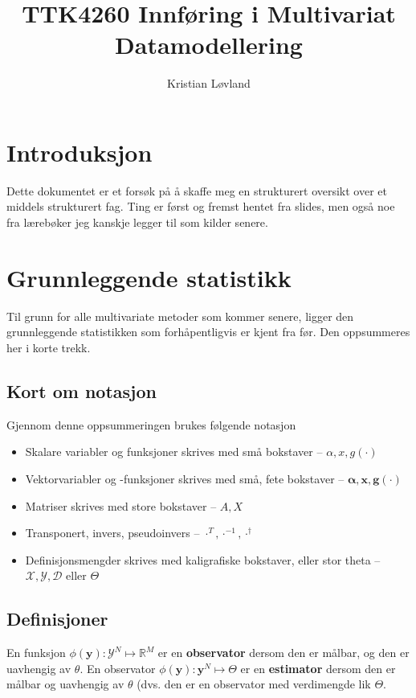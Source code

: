 \documentclass[12pt]{article}
\title{TTK4260 Innføring i Multivariat Datamodellering}
\date{}
\author{Kristian Løvland}
\begin{document}
\maketitle
\tableofcontents

\newpage
\section{Introduksjon}
Dette dokumentet er et forsøk på å skaffe meg en strukturert oversikt over et middels strukturert fag. Ting er først og fremst hentet fra slides, men også noe fra lærebøker jeg kanskje legger til som kilder senere.

\newpage
\section{Grunnleggende statistikk}
Til grunn for alle multivariate metoder som kommer senere, ligger den grunnleggende statistikken som forhåpentligvis er kjent fra før. Den oppsummeres her i korte trekk.

\subsection{Kort om notasjon}
Gjennom denne oppsummeringen brukes følgende notasjon
\begin{itemize}
\item Skalare variabler og funksjoner skrives med små bokstaver -- $\alpha, x, g(\cdot)$
\item Vektorvariabler og -funksjoner skrives med små, fete bokstaver -- $\mathbf{\alpha}, \mathbf{x}, \mathbf{g(\cdot)}$
\item Matriser skrives med store bokstaver -- $A, X$
\item Transponert, invers, pseudoinvers -- $\cdot^T, \cdot^{-1}, \cdot^\dagger$
\item Definisjonsmengder skrives med kaligrafiske bokstaver, eller stor theta -- $\mathcal{X}, \mathcal{Y}, \mathcal{D}$ eller $\Theta$
\end{itemize}

\subsection{Definisjoner}
En funksjon \(\phi(\boldsymbol{y}): \mathcal{Y}^{N} \mapsto \mathbb{R}^{M}\) er en \textbf{observator} dersom den er målbar, og den er uavhengig av $\theta$. En observator \(\phi(\boldsymbol{y}): \boldsymbol{y}^{N} \mapsto \Theta\) er en \textbf{estimator} dersom den er målbar og uavhengig av $\theta$ (dvs. den er en observator med verdimengde lik $\Theta$.
\end{document}
